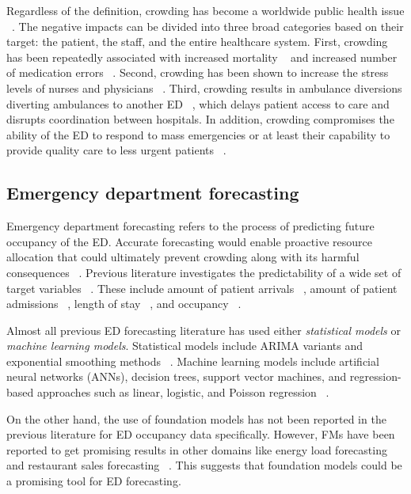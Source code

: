 Regardless of the definition, crowding has become a worldwide public health issue ~\cite{sartini_overcrowding_2022}. The negative impacts can be divided into three broad categories based on their target: the patient, the staff, and the entire healthcare system. 
First, crowding has been repeatedly associated with increased mortality ~\cite{berg_associations_2019} and increased number of medication errors ~\cite{KULSTAD2010304}. Second, crowding has been shown to increase the stress levels of nurses and physicians ~\cite{bond_frequency_2007}. 
Third, crowding results in ambulance diversions diverting ambulances to another ED ~\cite{asplin2003conceptual}, which delays patient access to care and disrupts coordination between hospitals. 
In addition, crowding compromises the ability of the ED to respond to mass emergencies or at least their capability to provide quality care to less urgent patients ~\cite{Bernstein2009}.

\subsection{Emergency department forecasting}

Emergency department forecasting refers to the process of predicting future occupancy of the ED. Accurate forecasting would enable proactive resource allocation that could ultimately prevent crowding along with its harmful consequences ~\cite{gul2018exhaustive}.
Previous literature investigates the predictability of a wide set of target variables ~\cite{gul2018exhaustive}. These include amount of patient arrivals ~\cite{zibners2006local}, amount of patient admissions ~\cite{GOLMOHAMMADI2016535}, length of stay ~\cite{gul2015forecasting}, and occupancy ~\cite{tuominen_forecasting_2024}.

Almost all previous ED forecasting literature has used either \emph{statistical models} or \emph{machine learning models}. Statistical models include ARIMA variants and exponential smoothing methods ~\cite{brockwell_introduction_2016}. Machine learning models include artificial neural networks (ANNs), decision trees, support vector machines, and regression-based approaches such as linear, logistic, and Poisson regression ~\cite{james2021introduction,gul2018exhaustive}.

On the other hand, the use of foundation models has not been reported in the previous literature for ED occupancy data specifically. However, FMs have been reported to get promising results in other domains like energy load forecasting ~\cite{saravanan2025shorttermloadforecasting} and restaurant sales forecasting ~\cite{arab2025benchmarkingtimeseriesforecasting}. This suggests that foundation models could be a promising tool for ED forecasting.

